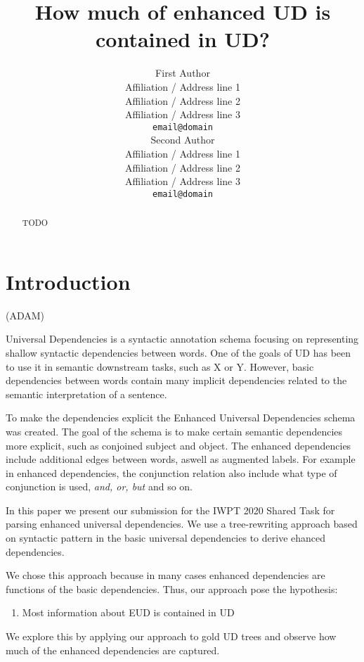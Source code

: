 \documentclass[11pt,a4paper]{article}
\title{How much of enhanced UD is contained in UD?}
\author{First Author \\
  Affiliation / Address line 1 \\
  Affiliation / Address line 2 \\
  Affiliation / Address line 3 \\
  \texttt{email@domain} \\\And
  Second Author \\
  Affiliation / Address line 1 \\
  Affiliation / Address line 2 \\
  Affiliation / Address line 3 \\
  \texttt{email@domain} \\}
\date{}
\begin{document}
\maketitle
\begin{abstract}
  TODO
\end{abstract}

\section{Introduction}
(ADAM)

Universal Dependencies is a syntactic annotation schema focusing
on representing shallow syntactic dependencies between words. One
of the goals of UD has been to use it in semantic downstream
tasks, such as X or Y. However, basic dependencies between words
contain many implicit dependencies related to the semantic
interpretation of a sentence.

To make the dependencies explicit the Enhanced Universal
Dependencies schema was created. The goal of the schema is to
make certain semantic dependencies more explicit, such as
conjoined subject and object. The enhanced dependencies include
additional edges between words, aswell as augmented labels. For
example in enhanced dependencies, the conjunction relation also
include what type of conjunction is used, \textit{and, or,
but} and so on.

In this paper we present our submission for the IWPT 2020 Shared
Task for parsing enhanced universal dependencies. We use a
tree-rewriting approach based on syntactic pattern in the basic
universal dependencies to derive ehanced dependencies.

We chose this approach because in many cases enhanced dependencies
are functions of the basic dependencies. Thus, our approach pose
the hypothesis:
\begin{enumerate}
    \item Most information about EUD is contained in UD
\end{enumerate}

We explore this by applying our approach to gold UD trees and
observe how much of the enhanced dependencies are captured.

    
   
    
\end{document}
